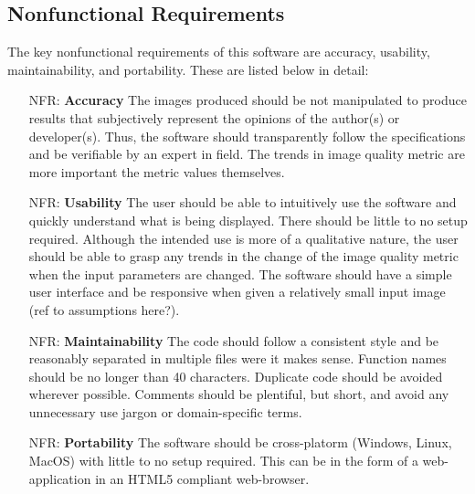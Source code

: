 \documentclass[12pt]{article}
\newcounter{nfrnum} %
\begin{document}
\subsection{Nonfunctional Requirements}

The key nonfunctional requirements of this software are accuracy, usability, 
maintainability, and portability. These are listed below in detail:

\noindent \begin{itemize}

\item[NFR\refstepcounter{nfrnum}\thenfrnum \label{NFR_Accuracy}:]
  \textbf{Accuracy} The images produced should be not manipulated to produce 
  results that subjectively represent the opinions of the author(s) or 
  developer(s). Thus, the software should transparently follow the 
  specifications and be verifiable by an expert in field. The trends in image 
  quality metric are more important the metric values themselves.

\item[NFR\refstepcounter{nfrnum}\thenfrnum \label{NFR_Usability}:] \textbf{Usability} The user should be able to intuitively use the 
  software and quickly understand what is being displayed. There should be 
  little to no setup required. Although the intended 
  use is more of a qualitative nature, the user should be able to grasp any 
  trends in the change of the image quality metric when the input parameters are 
  changed. The software should have a simple user interface and be responsive 
  when given a relatively small input image (ref to assumptions here?).

\item[NFR\refstepcounter{nfrnum}\thenfrnum \label{NFR_Maintainability}:]
  \textbf{Maintainability} The code should follow a consistent style and
  be reasonably separated in multiple files were it makes sense. Function names 
  should be no longer than 40 characters. Duplicate code should be avoided 
  wherever possible. Comments should be plentiful, but short, and avoid any 
  unnecessary use jargon or domain-specific terms.

\item[NFR\refstepcounter{nfrnum}\thenfrnum \label{NFR_Portability}:]
  \textbf{Portability} The software should be cross-platorm (Windows, Linux, 
  MacOS) with little to no setup required. This can be in the form of a 
  web-application in an HTML5 compliant web-browser.

\end{itemize}
\end{document}

